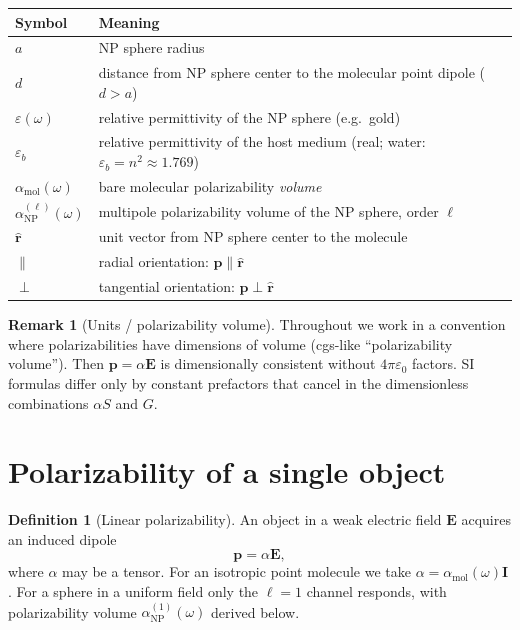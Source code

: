 \documentclass[11pt,a4paper]{article}
\theoremstyle{definition}
\newtheorem{definition}{Definition}[section]
\newtheorem{remark}{Remark}[section]
\newcommand{\epsb}{\varepsilon_b}
\newcommand{\epsm}{\varepsilon}
\newcommand{\alpham}{\alpha_{\text{mol}}}
\newcommand{\alphanp}{\alpha_{\text{NP}}}
\newcommand{\p}{\mathbf{p}}
\newcommand{\rhat}{\hat{\mathbf{r}}}
\newcommand{\I}{\mathbf{I}}
\begin{document}
\begin{center}
  \begin{tabular}{@{}ll@{}}
  \toprule
  Symbol & Meaning \\
  \midrule
  $a$ & NP sphere radius \\
  $d$ & distance from NP sphere center to the molecular point dipole ($d>a$) \\
  $\epsm(\omega)$ & relative permittivity of the NP sphere (e.g.\ gold) \\
  $\epsb$ & relative permittivity of the host medium (real; water: $\epsb=n^2\approx 1.769$) \\
  $\alpham(\omega)$ & bare molecular polarizability \emph{volume} \\
  $\alphanp^{(\ell)}(\omega)$ & multipole polarizability volume of the NP sphere, order $\ell$ \\
  $\rhat$ & unit vector from NP sphere center to the molecule \\
  $\parallel$ & radial orientation: $\p\parallel\rhat$ \\
  $\perp$ & tangential orientation: $\p\perp\rhat$ \\
  \bottomrule
  \end{tabular}
\end{center}

\begin{remark}[Units / polarizability volume]
\noindent
Throughout we work in a convention where polarizabilities have dimensions of volume (cgs-like ``polarizability volume''). Then $\p = \alpha \mathbf{E}$ is dimensionally consistent without $4\pi\varepsilon_0$ factors. SI formulas differ only by constant prefactors that cancel in the dimensionless combinations $\alpha S$ and $G$.
\end{remark}

\section{Polarizability of a single object}

\begin{definition}[Linear polarizability]
\noindent
An object in a weak electric field $\mathbf{E}$ acquires an induced dipole
\begin{equation}
  \p = \alpha\mathbf{E} ,
  \label{eq:p-alpha-E}
\end{equation}
where $\alpha$ may be a tensor. For an isotropic point molecule we take $\alpha=\alpham(\omega) \I$. For a sphere in a uniform field only the $\ell=1$ channel responds, with polarizability volume $\alphanp^{(1)}(\omega)$ derived below.
\end{definition}
\end{document}
